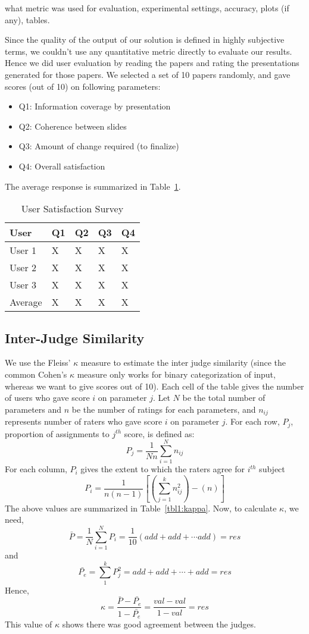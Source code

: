 what metric was used for evaluation, experimental settings, accuracy, plots (if any), tables.

Since the quality of the output of our solution is defined
in highly subjective terms, we couldn't use any quantitative metric
directly to evaluate our results. Hence we did user evaluation by reading
the papers and rating the presentations generated for those papers.
We selected a set of 10 papers randomly, and gave scores (out of 10) on following 
parameters:
\begin{itemize}
	\item Q1: Information coverage by presentation
	\item Q2: Coherence between slides
	\item Q3: Amount of change required (to finalize)
	\item Q4: Overall satisfaction
\end{itemize}
The average response is summarized in Table~\ref{tbl1:users}.

\begin{table}
\begin{center}
\caption{User Satisfaction Survey}
\begin{tabular}{| l | l | l | l | l |}
\hline
User & Q1 & Q2 & Q3 & Q4 \\ \hline
User 1 & X & X & X & X \\ 
User 2 & X & X & X & X \\ 
User 3 & X & X & X & X \\ \hline
Average & X & X & X & X \\ \hline
\end{tabular}
\label{tbl1:users}
\end{center}
\end{table}	


\subsection{Inter-Judge Similarity}
We use the Fleiss' $\kappa$ measure \cite{kappa} to estimate the inter judge similarity
(since the common Cohen's $\kappa$ measure only works for binary categorization
of input, whereas we want to give scores out of 10).
Each cell of the table gives the number of users who gave score $i$ on 
parameter $j$. Let $N$ be the total number of parameters
and $n$ be the number of ratings for each parameters, and $n_{ij}$
represents number of raters who gave score $i$ on parameter $j$.
For each row, $P_j$, proportion of assignments to $j^{th}$ score, is defined as:
\[
	P_j = \frac{1}{Nn} \sum_{i=1}^{N} n_{ij}
\]
For each column, $P_i$ gives the extent to which the raters agree for $i^{th}$ subject
\[
	P_i = \frac{1}{n(n-1)} \left[ \left( \sum_{j=1}^{k} n_{ij}^{2} \right) - \left( n \right) \right]
\]
The above values are summarized in Table~\ref{tbl1:kappa}.
Now, to calculate $\kappa$, we need,
\[
	\bar{P} = \frac{1}{N} \sum_{i=1}^{N} P_i = \frac{1}{10} \left( add + add + \cdots add \right) = res
\]
and
\[
	\bar{P_e} = \sum_{1}^{k} P_j^2 = add + add + \cdots + add = res	
\]
Hence, 
\[
	\kappa = \frac {\bar{P} - \bar{P_e}} {1 - \bar{P_e}} = \frac{val - val}{1 - val} = res
\]
This value of $\kappa$ shows there was good agreement between the judges.

